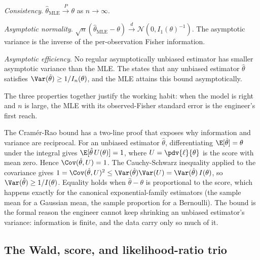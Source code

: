 \textit{Consistency}. $\hat{\theta}_{\mathrm{MLE}} \xrightarrow{P}
\theta$ as $n \to \infty$.

\textit{Asymptotic normality}. $\sqrt{n}(\hat{\theta}_{\mathrm{MLE}}
- \theta) \xrightarrow{d} \mathcal{N}(0, I_{1}(\theta)^{-1})$. The
asymptotic variance is the inverse of the per-observation Fisher
information.

\textit{Asymptotic efficiency}. No regular asymptotically unbiased
estimator has smaller asymptotic variance than the MLE. The
 states that any unbiased
estimator $\hat{\theta}$ satisfies $\Var(\hat{\theta}) \geq
1/I_{n}(\theta)$, and the MLE attains this bound asymptotically.

The three properties together justify the working habit: when the
model is right and $n$ is large, the MLE with its observed-Fisher
standard error is the engineer's first reach.

\begin{mastery}
The Cram\'er-Rao bound has a two-line proof that exposes why
information and variance are reciprocal. For an unbiased estimator
$\hat{\theta}$, differentiating $\E[\hat{\theta}] = \theta$ under
the integral gives $\E[\hat{\theta}\,U(\theta)] = 1$, where
$U = \pdv{\ell}{\theta}$ is the score with mean zero. Hence
$\Cov(\hat{\theta}, U) = 1$. The Cauchy-Schwarz inequality applied
to the covariance gives $1 = \Cov(\hat{\theta}, U)^{2} \leq
\Var(\hat{\theta})\Var(U) = \Var(\hat{\theta})\,I(\theta)$, so
$\Var(\hat{\theta}) \geq 1/I(\theta)$. Equality holds when
$\hat{\theta} - \theta$ is proportional to the score, which happens
exactly for the canonical exponential-family estimators (the sample
mean for a Gaussian mean, the sample proportion for a Bernoulli).
The bound is the formal reason the engineer cannot keep shrinking an
unbiased estimator's variance: information is finite, and the data
carry only so much of it.
\end{mastery}

\subsection{The Wald, score, and likelihood-ratio trio}

